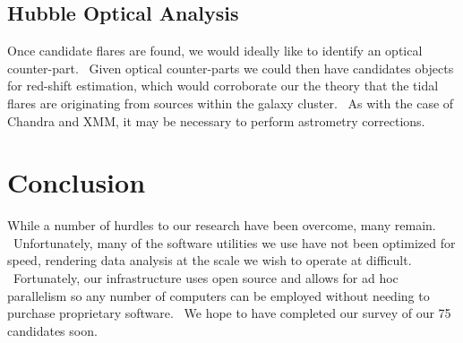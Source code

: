 \documentclass{amsart}
\begin{document}
\subsection{Hubble Optical Analysis}

Once candidate flares are found, we would ideally like to identify an optical
counter-part. \ Given optical counter-parts we could then have candidates
objects for red-shift estimation, which would corroborate our the theory that
the tidal flares are originating from sources within the galaxy cluster. \ As
with the case of Chandra and XMM, it may be necessary to perform astrometry
corrections.

\section{Conclusion}

While a number of hurdles to our research have been overcome, many remain. \
Unfortunately, many of the software utilities we use have not been optimized
for speed, rendering data analysis at the scale we wish to operate at
difficult. \ Fortunately, our infrastructure uses open source and allows for
ad hoc parallelism so any number of computers can be employed without needing
to purchase proprietary software. \ We hope to have completed our survey of
our 75 candidates soon.

{}

\end{document}
